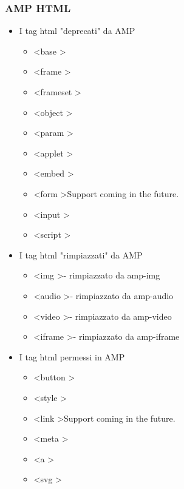 \documentclass{article}
\begin{document}
\subsubsection{AMP HTML}
    \begin{itemize}
        \item I tag html "deprecati" da AMP
        \begin{itemize}
            \item \textless base \textgreater
            \item \textless frame \textgreater
            \item \textless frameset \textgreater
            \item \textless object \textgreater
            \item \textless param \textgreater
            \item \textless applet \textgreater
            \item \textless embed \textgreater
            \item \textless form \textgreater Support coming in the future.
            \item \textless input \textgreater
            \item \textless script \textgreater
        \end{itemize}
        \item I tag html "rimpiazzati" da AMP
        \begin{itemize}
            \item \textless img \textgreater - rimpiazzato da amp-img
            \item \textless audio \textgreater - rimpiazzato da amp-audio
            \item \textless video \textgreater - rimpiazzato da amp-video
            \item \textless iframe \textgreater - rimpiazzato da amp-iframe
        \end{itemize}
        \item I tag html permessi in  AMP
        \begin{itemize}
            \item \textless button \textgreater
            \item \textless style \textgreater
            \item \textless link \textgreater Support coming in the future.
            \item \textless meta \textgreater
            \item \textless a \textgreater
            \item \textless svg \textgreater
        \end{itemize}
    \end{itemize}
\end{document}

